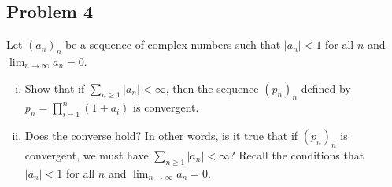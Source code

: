 \documentclass[10pt]{mypackage}
\begin{document}
\subsection{Problem 4}%
\begin{problem}
  Let $\left( a_n \right)_n$ be a sequence of complex numbers such that $\left\vert a_n \right\vert < 1$ for all $n$ and $\lim_{n\rightarrow\infty} a_n = 0$.
  \begin{enumerate}[(i)]
    \item Show that if $\sum_{n\geq 1}\left\vert a_n \right\vert < \infty$, then the sequence $\left( p_n \right)_n$ defined by $p_n = \prod_{i=1}^{n}\left( 1 + a_i \right)$ is convergent.
    \item Does the converse hold? In other words, is it true that if $\left( p_n \right)_n$ is convergent, we must have $\sum_{n\geq 1}\left\vert a_n \right\vert < \infty$? Recall the conditions that $\left\vert a_n \right\vert < 1$ for all $n$ and $\lim_{n\rightarrow \infty}a_n = 0$.
  \end{enumerate}
\end{problem}
\end{document}

